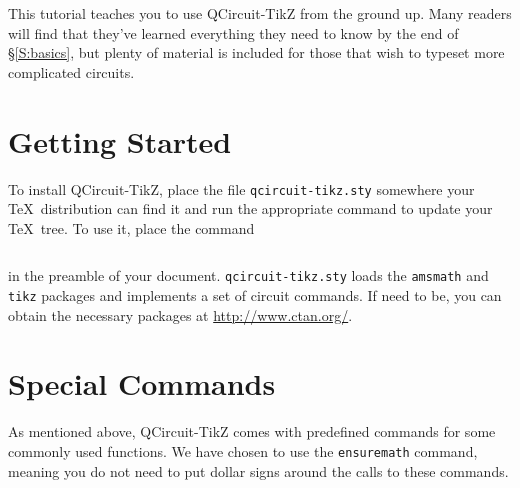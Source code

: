 \documentclass[twocolumn,nofootinbib,aps,,pra]{revtex4-1}
\begin{document}
This tutorial teaches you to use QCircuit-TikZ from the ground up. 
Many readers will find that they've learned everything they need to know by the end of \S\ref{S:basics}, but plenty of material is included for those that wish to typeset more complicated circuits.

\section{Getting Started}

To install QCircuit-TikZ, place the file \verb=qcircuit-tikz.sty= somewhere your \TeX\ distribution can find it and run the appropriate command to update your \TeX\ tree. 
To use it, place the command
{\small \begin{verbatim}\end{verbatim}}  
\noindent in the preamble of your document. 
\verb=qcircuit-tikz.sty= loads the \verb=amsmath= and \verb=tikz= packages and implements a set of circuit commands. 
If need to be, you can obtain the necessary packages at \href{http://www.ctan.org/}{http://www.ctan.org/}.


\section{Special Commands}
As mentioned above, QCircuit-TikZ comes with predefined commands for some commonly used functions. 
We have chosen to use the \verb=ensuremath= command, meaning you do not need to put dollar signs around the calls to these commands.
\end{document}

